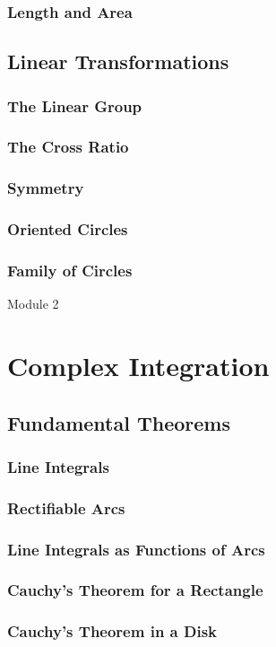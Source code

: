 \subsubsection{Length and Area}
\subsection{Linear Transformations}
\subsubsection{The Linear Group}
\subsubsection{The Cross Ratio}
\subsubsection{Symmetry}
\subsubsection{Oriented Circles}
\subsubsection{Family of Circles}

{\Large Module 2 }
\section{Complex Integration}
\subsection{Fundamental Theorems}
\subsubsection{Line Integrals}
\subsubsection{Rectifiable Arcs}
\subsubsection{Line Integrals as Functions of Arcs}
\subsubsection{Cauchy's Theorem for a Rectangle}
\subsubsection{Cauchy's Theorem in a Disk}
